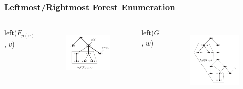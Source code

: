 \documentclass{beamer}
\begin{document}
\begin{frame}
\frametitle{Leftmost/Rightmost Forest Enumeration}
\begin{columns}[c]
left($F_{p(v)}$, $v$)
\begin{figure}
	\includegraphics[width=0.8\linewidth]{leftFPV}
	\label{leftFPV} 
	\centering
\end{figure}
left($G$, $w$)
\begin{figure}
	\includegraphics[width=0.8\linewidth]{leftF}
	\label{leftF} 
	\centering
\end{figure}
\end{columns}

\end{frame}
\end{document}

